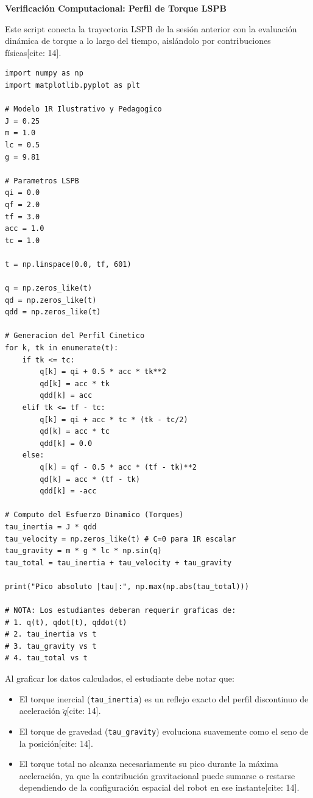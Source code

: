 \documentclass[11pt, a4paper]{article}
\begin{document}
\begin{center}
    \Large\textbf{\textcolor{ucbblue}{Verificación Computacional: Perfil de Torque LSPB}}\\[0.2cm]
\end{center}

Este script conecta la trayectoria LSPB de la sesión anterior con la evaluación dinámica de torque a lo largo del tiempo, aislándolo por contribuciones físicas[cite: 14].

\begin{lstlisting}
import numpy as np
import matplotlib.pyplot as plt

# Modelo 1R Ilustrativo y Pedagogico
J = 0.25
m = 1.0
lc = 0.5
g = 9.81

# Parametros LSPB
qi = 0.0
qf = 2.0
tf = 3.0
acc = 1.0
tc = 1.0

t = np.linspace(0.0, tf, 601)

q = np.zeros_like(t)
qd = np.zeros_like(t)
qdd = np.zeros_like(t)

# Generacion del Perfil Cinetico
for k, tk in enumerate(t):
    if tk <= tc:
        q[k] = qi + 0.5 * acc * tk**2
        qd[k] = acc * tk
        qdd[k] = acc
    elif tk <= tf - tc:
        q[k] = qi + acc * tc * (tk - tc/2)
        qd[k] = acc * tc
        qdd[k] = 0.0
    else:
        q[k] = qf - 0.5 * acc * (tf - tk)**2
        qd[k] = acc * (tf - tk)
        qdd[k] = -acc

# Computo del Esfuerzo Dinamico (Torques)
tau_inertia = J * qdd
tau_velocity = np.zeros_like(t) # C=0 para 1R escalar
tau_gravity = m * g * lc * np.sin(q)
tau_total = tau_inertia + tau_velocity + tau_gravity

print("Pico absoluto |tau|:", np.max(np.abs(tau_total)))

# NOTA: Los estudiantes deberan requerir graficas de:
# 1. q(t), qdot(t), qddot(t)
# 2. tau_inertia vs t
# 3. tau_gravity vs t
# 4. tau_total vs t
\end{lstlisting}

\begin{tcolorbox}[colback=white, colframe=ucbblue, title=\textbf{Interpretación Obligatoria}]
Al graficar los datos calculados, el estudiante debe notar que:
\begin{itemize}
    \item El torque inercial (\texttt{tau\_inertia}) es un reflejo exacto del perfil discontinuo de aceleración $\ddot{q}$[cite: 14].
    \item El torque de gravedad (\texttt{tau\_gravity}) evoluciona suavemente como el seno de la posición[cite: 14].
    \item El torque total no alcanza necesariamente su pico durante la máxima aceleración, ya que la contribución gravitacional puede sumarse o restarse dependiendo de la configuración espacial del robot en ese instante[cite: 14].
\end{itemize}
\end{tcolorbox}
\end{document}
